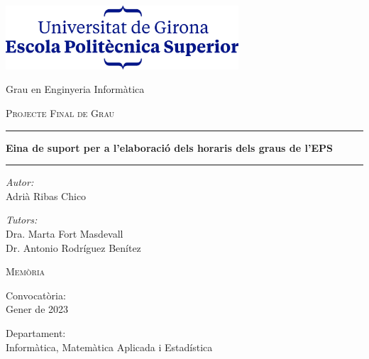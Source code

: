 \documentclass[a4paper,12pt]{ThesisStyle}
\begin{document}
\begin{titlepage}

\setlength{\parskip}{0pt}

\begin{center}
\includegraphics[width=0.65\textwidth]{assets/logos/EPS_centrat.png}

\vspace{2cm}

{\Large Grau en Enginyeria Informàtica\par}
\vspace{0.2cm}
\vspace{3.5cm}
\textsc{\Large Projecte Final de Grau}
\vspace{0.2cm}

\begin{center}
  \rule{\textwidth}{0.05cm}
\end{center}
\vspace{0.15cm}
{\huge \bfseries Eina de suport per a l'elaboració dels horaris dels graus de l'EPS\par}
\vspace{0.4cm}
\begin{center}
  \rule{\textwidth}{0.05cm}
\end{center}

\vspace{1cm}
 
\begin{minipage}[t]{0.4\textwidth}
\begin{flushleft}
    \large
    \emph{Autor:}\\
    Adrià Ribas Chico
\end{flushleft}
\end{minipage}
\begin{minipage}[t]{0.45\textwidth}
\begin{flushright} 
    \large
    \emph{Tutors:} \\
    Dra. Marta Fort Masdevall \\
    Dr. Antonio Rodríguez Benítez
\end{flushright}
\end{minipage}

\vspace{1.2cm}

\textsc{\Large Memòria}

\vspace{1.2cm}

{\large
Convocatòria:\\
Gener de 2023

\vspace{0.9cm}

Departament:\\
Informàtica, Matemàtica Aplicada i Estadística\\
}
\vfill
\end{center}
\end{titlepage}
\restoregeometry
\end{document}
